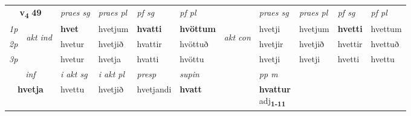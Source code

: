 \noindent
\begin{tabular}{lllllllllll} \toprule
\multicolumn{2}{c}{\textbf{v{\textsubscript{4}}} \Large{\textbf{49}}}  &  \textit{praes sg}  & \textit{praes pl}  &\textit{ pf sg} & \textit{pf pl} &  &  \textit{praes sg}  & \textit{praes pl}  & \textit{pf sg} & \textit{pf pl } \\*
	\cmidrule{3-6} \cmidrule{8-11}
 {\textit{1p}} & \multirow{3}{*}{\begin{turn}{90}\textit{akt ind}\end{turn}} & \textbf{hvet} & hvetjum & \textbf{hvatti} & \textbf{hvöttum} & \multirow{3}{*}{\begin{turn}{90}\textit{akt con}\end{turn}} &hvetji & hvetjum & \textbf{hvetti} & hvettum\\*
 {\textit{2p}} &  &  hvetur  & hvetjið & hvattir & hvöttuð & & hvetjir & hvetjið & hvettir & hvettuð \\*
{\textit{3p}} &  & hvetur & hvetja & hvatti & hvöttu & & hvetji & hvetji& hvetti & hvettu \\*
\cmidrule{3-6} \cmidrule{8-11}

   \multicolumn{2}{c}{\textit{inf}}  & \textit{i akt sg} & \textit{i akt pl}   & \textit{presp} & \textit{supin}  && \textit{pp m} \\*
  \multicolumn{2}{c}{\textbf{hvetja}} & hvettu  & hvetjið   & hvetjandi &  \textbf{hvatt}  && \specialcell{\textbf{hvattur} \\ adj\textbf{\textsubscript{1-11}}} \\*
\end{tabular}

